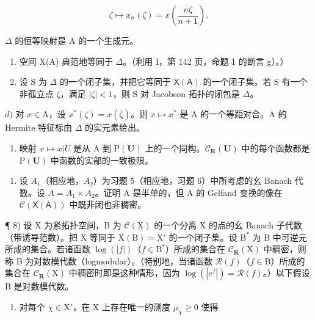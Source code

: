 \[
\zeta \mapsto x _ {n} (\zeta) = x \left(\frac {n \zeta}{n + 1}\right).
\]

\(\Delta\) 的恒等映射是 A 的一个生成元。

\begin{enumerate}
\def\labelenumi{\alph{enumi})}
\setcounter{enumi}{1}
\item
  空间 X(A) 典范地等同于 \(\Delta\)。（利用 I，第 142 页，命题 1 的断言 g）。）
\item
  设 S 为 \(\Delta\) 的一个闭子集，并把它等同于 \(\mathsf{X}(\mathsf{A})\) 的一个闭子集。若 S 有一个非孤立点 \(\zeta\)，满足 \(|\zeta| < 1\)，则 S 对 Jacobson 拓扑的闭包是 \(\Delta\)。
\end{enumerate}

\(d)\) 对 \(x \in \mathrm{A}\)，设 \(x^{*}(\zeta) = x(\overline{\zeta})\)。则 \(x \mapsto x^{*}\) 是 A 的一个等距对合。A 的 Hermite 特征标由 \(\Delta\) 的实元素给出。

\begin{enumerate}
\def\labelenumi{\alph{enumi})}
\setcounter{enumi}{4}
\tightlist
\item
  映射 \(x \mapsto x|U\) 是从 A 到 \(\mathrm{P}(\mathbf{U})\) 上的一个同构。\(\mathcal{C}_{\mathbf{R}}(\mathbf{U})\) 中的每个函数都是 \(\mathrm{P}(\mathbf{U})\) 中函数的实部的一致极限。
\end{enumerate}

\begin{enumerate}
\def\labelenumi{\arabic{enumi})}
\setcounter{enumi}{6}
\tightlist
\item
  设 \(A_{1}\)（相应地，\(A_{2}\)）为习题 5（相应地，习题 6）中所考虑的幺 Banach 代数。设 \(A = A_{1} \times A_{2}\)。证明 A 是半单的，但 A 的 Gelfand 变换的像在 \(\mathcal{C}(\mathsf{X}(\mathsf{A}))\) 中既非闭也非稠密。
\end{enumerate}

¶ 8) 设 X 为紧拓扑空间，B 为 \(\mathcal{C}(\mathrm{X})\) 的一个分离 X 的点的幺 Banach 子代数（带诱导范数）。把 X 等同于 \(\mathrm{X(B)} = \mathrm{X}'\) 的一个闭子集。设 \(\mathrm{B}^*\) 为 B 中可逆元所成的集合。若诸函数 \(\log(|f|)\)（\(f \in \mathrm{B}^*\)）所成的集合在 \(\mathcal{C}_{\mathbf{R}}(\mathrm{X})\) 中稠密，则称 B 为对数模代数（logmodular）。（特别地，当诸函数 \(\mathcal{R}(f)\)（\(f \in \mathrm{B}\)）所成的集合在 \(\mathcal{C}_{\mathbf{R}}(\mathrm{X})\) 中稠密时即是这种情形，因为 \(\log(|e^f|) = \mathcal{R}(f)\)。）以下假设 B 是对数模代数。

\begin{enumerate}
\def\labelenumi{\alph{enumi})}
\tightlist
\item
  对每个 \(\chi \in \mathrm{X}'\)，在 X 上存在唯一的测度 \(\mu_{\chi} \geqslant 0\) 使得
\end{enumerate}

